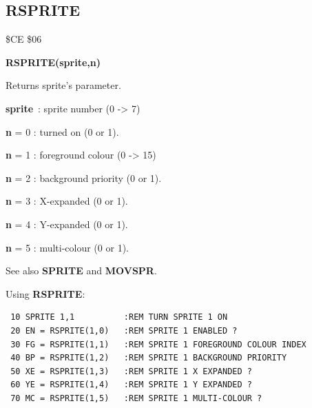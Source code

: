 \subsection{RSPRITE}
\begin{description}[leftmargin=2cm,style=nextline]
\item [Token:] \$CE \$06
\item [Format:] {\bf RSPRITE(sprite,n)}
\item [Usage:]  Returns sprite's parameter.

                {\bf sprite} : sprite number (0 -> 7)

                {\bf n} = 0 : turned on (0 or 1).

                {\bf n} = 1 : foreground colour (0 -> 15)

                {\bf n} = 2 : background priority (0 or 1).

                {\bf n} = 3 : X-expanded (0 or 1).

                {\bf n} = 4 : Y-expanded (0 or 1).

                {\bf n} = 5 : multi-colour (0 or 1).

\item [Remarks:] See also {\bf SPRITE} and {\bf MOVSPR}.

\item [Example:] Using {\bf RSPRITE}:
\begin{tcolorbox}[colback=black,coltext=white]
\verbatimfont{\codefont}
\begin{verbatim}
 10 SPRITE 1,1          :REM TURN SPRITE 1 ON
 20 EN = RSPRITE(1,0)   :REM SPRITE 1 ENABLED ?
 30 FG = RSPRITE(1,1)   :REM SPRITE 1 FOREGROUND COLOUR INDEX
 40 BP = RSPRITE(1,2)   :REM SPRITE 1 BACKGROUND PRIORITY
 50 XE = RSPRITE(1,3)   :REM SPRITE 1 X EXPANDED ?
 60 YE = RSPRITE(1,4)   :REM SPRITE 1 Y EXPANDED ?
 70 MC = RSPRITE(1,5)   :REM SPRITE 1 MULTI-COLOUR ?
\end{verbatim}
\end{tcolorbox}
\end{description}




\newpage
